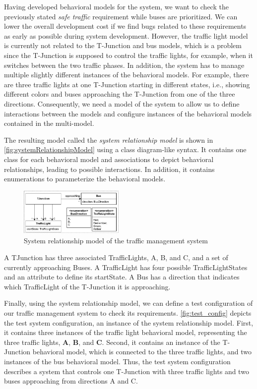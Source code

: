 \documentclass{jot}
\begin{document}
Having developed behavioral models for the system, we want to check the previously stated \emph{safe traffic} requirement while buses are prioritized.
We can lower the overall development cost if we find bugs related to these requirements as early as possible during system development.
However, the traffic light model is currently not related to the T-Junction and bus models, which is a problem since the T-Junction is supposed to control the traffic lights, for example, when it switches between the two traffic phases.
In addition, the system has to manage multiple slightly different instances of the behavioral models.
For example, there are three traffic lights at one T-Junction starting in different states, i.e., showing different colors and buses approaching the T-Junction from one of the three directions.
Consequently, we need a model of the system to allow us to define interactions between the models and configure instances of the behavioral models contained in the multi-model.

The resulting model called the \emph{system relationship model} is shown in \autoref{fig:systemRelationshipModel} using a class diagram-like syntax.
It contains one class for each behavioral model and associations to depict behavioral relationships, leading to possible interactions.
In addition, it contains enumerations to parameterize the behavioral models. 

\begin{figure}[h]
    \centering
    \includegraphics[width=0.45\textwidth]{figures/systemRelationShipModel.pdf}
    \caption{System relationship model of the traffic management system}
    \label{fig:systemRelationshipModel}
\end{figure}

A \textsf{TJunction} has three associated \textsf{TrafficLight}s, A, B, and C, and a set of currently approaching \textsf{Bus}es.
A \textsf{TrafficLight} has four possible \textsf{TrafficLightState}s and an attribute to define its \textsf{startState}.
A \textsf{Bus} has a \textsf{direction} that indicates which \textsf{TrafficLight} of the T-Junction it is approaching.

Finally, using the system relationship model, we can define a test configuration of our traffic management system to check its requirements.
\autoref{fig:test_config} depicts the test system configuration, an instance of the system relationship model.
First, it contains three instances of the traffic light behavioral model, representing the three traffic lights, \textbf{A}, \textbf{B}, and \textbf{C}.
Second, it contains an instance of the T-Junction behavioral model, which is connected to the three traffic lights, and two instances of the bus behavioral model.
Thus, the test system configuration describes a system that controls one T-Junction with three traffic lights and two buses approaching from directions A and C.
\end{document}

